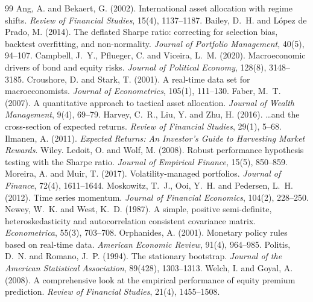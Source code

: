 \documentclass[11pt,a4paper]{article}
\begin{document}
\begin{thebibliography}{99}
 Ang, A. and Bekaert, G. (2002). International asset allocation with regime shifts. \emph{Review of Financial Studies}, 15(4), 1137--1187.
 Bailey, D.~H. and L\'opez de Prado, M. (2014). The deflated Sharpe ratio: correcting for selection bias, backtest overfitting, and non-normality. \emph{Journal of Portfolio Management}, 40(5), 94--107.
 Campbell, J.~Y., Pflueger, C. and Viceira, L.~M. (2020). Macroeconomic drivers of bond and equity risks. \emph{Journal of Political Economy}, 128(8), 3148--3185.
 Croushore, D. and Stark, T. (2001). A real-time data set for macroeconomists. \emph{Journal of Econometrics}, 105(1), 111--130.
 Faber, M.~T. (2007). A quantitative approach to tactical asset allocation. \emph{Journal of Wealth Management}, 9(4), 69--79.
 Harvey, C.~R., Liu, Y. and Zhu, H. (2016). \ldots and the cross-section of expected returns. \emph{Review of Financial Studies}, 29(1), 5--68.
 Ilmanen, A. (2011). \emph{Expected Returns: An Investor's Guide to Harvesting Market Rewards}. Wiley.
 Ledoit, O. and Wolf, M. (2008). Robust performance hypothesis testing with the Sharpe ratio. \emph{Journal of Empirical Finance}, 15(5), 850--859.
 Moreira, A. and Muir, T. (2017). Volatility-managed portfolios. \emph{Journal of Finance}, 72(4), 1611--1644.
 Moskowitz, T.~J., Ooi, Y.~H. and Pedersen, L.~H. (2012). Time series momentum. \emph{Journal of Financial Economics}, 104(2), 228--250.
 Newey, W.~K. and West, K.~D. (1987). A simple, positive semi-definite, heteroskedasticity and autocorrelation consistent covariance matrix. \emph{Econometrica}, 55(3), 703--708.
 Orphanides, A. (2001). Monetary policy rules based on real-time data. \emph{American Economic Review}, 91(4), 964--985.
 Politis, D.~N. and Romano, J.~P. (1994). The stationary bootstrap. \emph{Journal of the American Statistical Association}, 89(428), 1303--1313.
 Welch, I. and Goyal, A. (2008). A comprehensive look at the empirical performance of equity premium prediction. \emph{Review of Financial Studies}, 21(4), 1455--1508.
\end{thebibliography}
\end{document}

